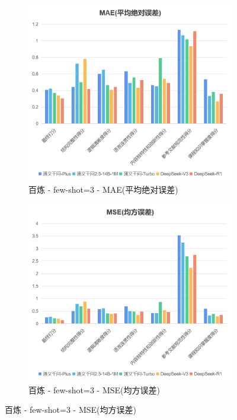 \documentclass{article}
\begin{document}
\begin{figure}[h!]
	\centering
	\begin{subfigure}{0.3\linewidth}
		\centering
		\includegraphics[width=0.9\linewidth]{img/bailian-fewShot3-MAE.png}
		\caption{百炼 - few-shot=3 - MAE(平均绝对误差)}
		\label{fig:bailian-fewShot3-MAE}
	\end{subfigure}
	\centering
	\begin{subfigure}{0.3\linewidth}
		\centering
		\includegraphics[width=0.9\linewidth]{img/bailian-fewShot3-MSE.png}
		\caption{百炼 - few-shot=3 - MSE(均方误差)}
		\label{fig:bailian-fewShot3-MSE}
	\end{subfigure}

\end{figure}
\end{document}
